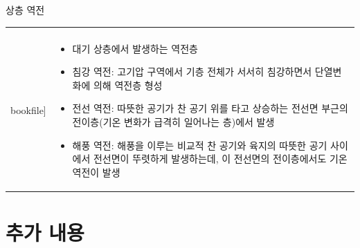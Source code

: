 \begin{frame}[t]{상층 역전}
	\begin{tabular}{ll}
		\begin{minipage}[t]{.5\textwidth}
			\begin{figure}{}
				\texttt{[image: \\bookfile]} 
			\end{figure}
		\end{minipage}
		&
		\begin{minipage}[t]{.45\textwidth}	
			
			\begin{itemize} \scriptsize 
				\item 대기 상층에서 발생하는 역전층
				\item 침강 역전: 고기압 구역에서 기층 전체가 서서히 침강하면서 단열변화에 의해 역전층 형성
				\item 전선 역전: 따뜻한 공기가 찬 공기 위를 타고 상승하는 전선면 부근의 전이층(기온 변화가 급격히 일어나는 층)에서 발생
				\item 해풍 역전: 해풍을 이루는 비교적 찬 공기와 육지의 따뜻한 공기 사이에서 전선면이 뚜렷하게 발생하는데, 이 전선면의 전이층에서도 기온 역전이 발생
			\end{itemize}
			
	
		\end{minipage}
	\end{tabular}
\end{frame}




\section{추가 내용}



